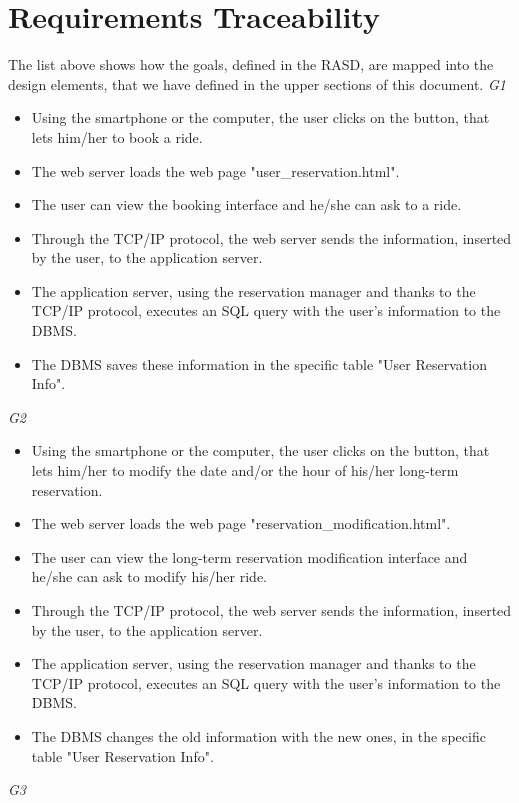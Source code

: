 \section{Requirements Traceability}
The list above shows how the goals, defined in the RASD, are mapped into the design elements, that we have defined in the upper sections of this document.
	\emph{G1}
		\begin{itemize}
			\item Using the smartphone or the computer, the user clicks on the button, that lets him/her to book a ride.
			\item The web server loads the web page "user_reservation.html".
			\item The user can view the booking interface and he/she can ask to a ride.
			\item Through the TCP/IP protocol, the web server sends the information, inserted by the user, to the application server.
			\item The application server, using the reservation manager and thanks to the TCP/IP protocol, executes an SQL query with the user's information to the DBMS.
			\item The DBMS saves these information in the specific table "User Reservation Info".
		\end{itemize}
	\emph{G2}
		\begin{itemize}
			\item Using the smartphone or the computer, the user clicks on the button, that lets him/her to modify the date and/or the hour of his/her long-term reservation.
			\item The web server loads the web page "reservation_modification.html".
			\item The user can view the long-term reservation modification interface and he/she can ask to modify his/her ride.
			\item Through the TCP/IP protocol, the web server sends the information, inserted by the user, to the application server.
			\item The application server, using the reservation manager and thanks to the TCP/IP protocol, executes an SQL query with the user's information to the DBMS.
			\item The DBMS changes the old information with the new ones, in the specific table "User Reservation Info".
		\end{itemize}
	\emph{G3}
